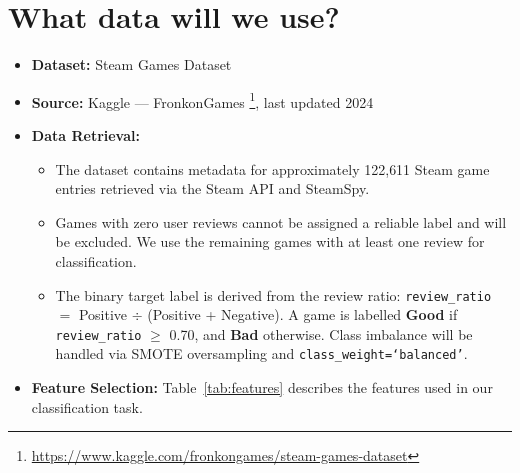 \documentclass[11pt, a4paper]{article}
\begin{document}
\section{What data will we use?}

\begin{itemize}
  \item \textbf{Dataset:} Steam Games Dataset
  \item \textbf{Source:} Kaggle --- FronkonGames \footnote{\url{https://www.kaggle.com/fronkongames/steam-games-dataset}}, last updated 2024
  \item \textbf{Data Retrieval:}
  \begin{itemize}
    \item The dataset contains metadata for approximately 122{,}611 Steam game entries
          retrieved via the Steam API and SteamSpy.
    \item Games with zero user reviews cannot be assigned a reliable label and will
          be excluded. We use the remaining games with at least one review for
          classification.
    \item The binary target label is derived from the review ratio:
          \texttt{review\_ratio} $=$ Positive $\div$ (Positive + Negative).
          A game is labelled \textbf{Good} if \texttt{review\_ratio} $\geq$ 0.70,
          and \textbf{Bad} otherwise. Class imbalance will be handled via SMOTE
          oversampling and \texttt{class\_weight=`balanced'}.
  \end{itemize}
  \item \textbf{Feature Selection:} Table~\ref{tab:features} describes the features
        used in our classification task.
\end{itemize}
\end{document}
